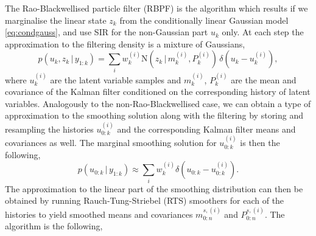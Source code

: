 \documentclass[twocolumn]{autart}    %
\begin{document}
The Rao-Blackwellised particle filter (RBPF) \cite{Doucet+Godsill+Andrieu:2000,Chen+Liu:2000} is the algorithm which results if we marginalise the linear state $z_k$ from the conditionally linear Gaussian model \eqref{eq:condgauss}, and use SIR for the non-Gaussian part $u_k$ only. At each step the approximation to the filtering density is a mixture of Gaussians,
%
\begin{equation}
    p(u_k,z_k\,|\,y_{1:k})
    = \sum_i w_k^{(i)}
  \mathrm{N}(z_k\,|\,m_k^{(i)},P_k^{(i)}) \, \delta(u_k - u_k^{(i)}),
\nonumber
\end{equation}
%
where $u_k^{(i)}$ are the latent variable samples and $m_k^{(i)}$, $P_k^{(i)}$ are the mean and covariance of the Kalman filter conditioned on the corresponding history of latent variables. Analogously to the non-Rao-Blackwellised case, we can obtain a \cite{Kitagawa:1996} type of approximation to the smoothing solution along with the filtering by storing and resampling the histories $u^{(i)}_{0:k}$ and the corresponding Kalman filter means and covariances as well. The marginal smoothing solution for $u^{(i)}_{0:k}$ is then the following,
%
\begin{equation}
  p(u_{0:k}\,|\,y_{1:k}) \approx
  \sum_i w_k^{(i)} \delta(u_{0:k} - u_{0:k}^{(i)}).
\label{eq:rbpf_usmooth}
\end{equation}
%
The approximation to the linear part of the smoothing distribution can then be obtained by running Rauch-Tung-Striebel (RTS) smoothers for each of the histories to yield smoothed means and covariances $m^{s,(i)}_{0:n}$ and $P^{s,(i)}_{0:n}$. The algorithm is the following,
%
\end{document}
